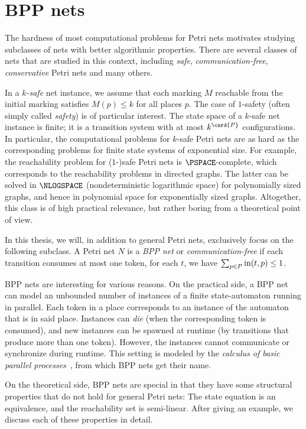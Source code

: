 \documentclass[../../diss.tex]{subfiles}
\begin{document}
\section{BPP nets}%
\label{Section:PNBPP}%

The hardness of most computational problems for Petri nets motivates studying subclasses of nets with better algorithmic properties.
There are several classes of nets that are studied in this context, including \emph{safe}, \emph{communication-free}, \emph{conservative} Petri nets and many others.

In a \emph{$k$-safe} net instance, we assume that each marking $M$ reachable from the initial marking satisfies $M(p) \leq k$ for all places $p$.
The case of $1$-safety (often simply called \emph{safety}) is of particular interest.
The state space of a $k$-safe net instance is finite; it is a transition system with at most $k^{\card{P}}$ configurations.
In particular, the computational problems for $k$-safe Petri nets are as hard as the corresponding problems for finite state systems of exponential size.
For example, the reachability problem for ($1$-)safe Petri nets is $\PSPACE$-complete, which corresponds to the reachability problems in directed graphs.
The latter can be solved in $\NLOGSPACE$ (nondeterministic logarithmic space) for polynomially sized graphs, and hence in polynomial space for exponentially sized graphs.
Altogether, this class is of high practical relevance, but rather boring from a theoretical point of view.

In this thesis, we will, in addition to general Petri nets, exclusively focus on the following subclass.
A Petri net $N$ is a \emph{BPP net} or \emph{communication-free} if each transition consumes at most one token, \ie for each $t$, we have $\sum_{p \in P} \text{in}(t,p) \leq 1$.

BPP nets are interesting for various reasons.
On the practical side, a BPP net can model an unbounded number of instances of a finite state-automaton running in parallel.
Each token in a place corresponds to an instance of the automaton that is in said place.
Instances can \emph{die} (when the corresponding token is consumed), and new instances can be spawned at runtime (by transitions that produce more than one token).
However, the instances cannot communicate or synchronize during runtime.
This setting is modeled by the \emph{calculus of basic parallel processes}~\cite{Christensen93}, from which BPP nets get their name.

On the theoretical side, BPP nets are special in that they have some structural properties that do not hold for general Petri nets:
The state equation is an equivalence, and the reachability set is semi-linear.
After giving an example, we discuss each of these properties in detail.
\end{document}
